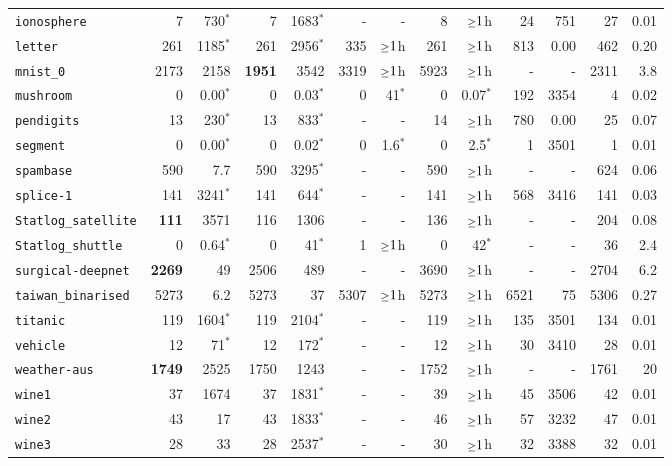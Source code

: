 \begin{tabular}{lrrrrrrrrrrrr}
\texttt{ionosphere} & 7 & 730$^*$ & 7 & 1683$^*$ & - & - & 8 & $\mathsmaller{\geq}1$h & 24 & 751 & 27 & 0.01\\
\texttt{letter} & 261 & 1185$^*$ & 261 & 2956$^*$ & 335 & $\mathsmaller{\geq}1$h & 261 & $\mathsmaller{\geq}1$h & 813 & 0.00 & 462 & 0.20\\
\texttt{mnist\_0} & 2173 & 2158 & \textbf{1951} & 3542 & 3319 & $\mathsmaller{\geq}1$h & 5923 & $\mathsmaller{\geq}1$h & - & - & 2311 & 3.8\\
\texttt{mushroom} & 0 & 0.00$^*$ & 0 & 0.03$^*$ & 0 & 41$^*$ & 0 & 0.07$^*$ & 192 & 3354 & 4 & 0.02\\
\texttt{pendigits} & 13 & 230$^*$ & 13 & 833$^*$ & - & - & 14 & $\mathsmaller{\geq}1$h & 780 & 0.00 & 25 & 0.07\\
\texttt{segment} & 0 & 0.00$^*$ & 0 & 0.02$^*$ & 0 & 1.6$^*$ & 0 & 2.5$^*$ & 1 & 3501 & 1 & 0.01\\
\texttt{spambase} & 590 & 7.7 & 590 & 3295$^*$ & - & - & 590 & $\mathsmaller{\geq}1$h & - & - & 624 & 0.06\\
\texttt{splice-1} & 141 & 3241$^*$ & 141 & 644$^*$ & - & - & 141 & $\mathsmaller{\geq}1$h & 568 & 3416 & 141 & 0.03\\
\texttt{Statlog\_satellite} & \textbf{111} & 3571 & 116 & 1306 & - & - & 136 & $\mathsmaller{\geq}1$h & - & - & 204 & 0.08\\
\texttt{Statlog\_shuttle} & 0 & 0.64$^*$ & 0 & 41$^*$ & 1 & $\mathsmaller{\geq}1$h & 0 & 42$^*$ & - & - & 36 & 2.4\\
\texttt{surgical-deepnet} & \textbf{2269} & 49 & 2506 & 489 & - & - & 3690 & $\mathsmaller{\geq}1$h & - & - & 2704 & 6.2\\
\texttt{taiwan\_binarised} & 5273 & 6.2 & 5273 & 37 & 5307 & $\mathsmaller{\geq}1$h & 5273 & $\mathsmaller{\geq}1$h & 6521 & 75 & 5306 & 0.27\\
\texttt{titanic} & 119 & 1604$^*$ & 119 & 2104$^*$ & - & - & 119 & $\mathsmaller{\geq}1$h & 135 & 3501 & 134 & 0.01\\
\texttt{vehicle} & 12 & 71$^*$ & 12 & 172$^*$ & - & - & 12 & $\mathsmaller{\geq}1$h & 30 & 3410 & 28 & 0.01\\
\texttt{weather-aus} & \textbf{1749} & 2525 & 1750 & 1243 & - & - & 1752 & $\mathsmaller{\geq}1$h & - & - & 1761 & 20\\
\texttt{wine1} & 37 & 1674 & 37 & 1831$^*$ & - & - & 39 & $\mathsmaller{\geq}1$h & 45 & 3506 & 42 & 0.01\\
\texttt{wine2} & 43 & 17 & 43 & 1833$^*$ & - & - & 46 & $\mathsmaller{\geq}1$h & 57 & 3232 & 47 & 0.01\\
\texttt{wine3} & 28 & 33 & 28 & 2537$^*$ & - & - & 30 & $\mathsmaller{\geq}1$h & 32 & 3388 & 32 & 0.01\\
\bottomrule
\end{tabular}
